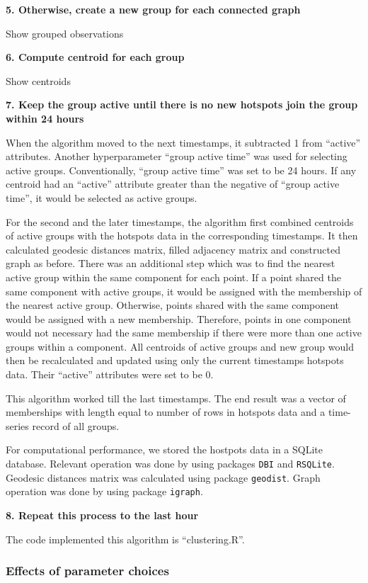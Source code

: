 \textbf{5. Otherwise, create a new group for each connected graph}

Show grouped observations

\textbf{6. Compute centroid for each group}

Show centroids

\textbf{7. Keep the group active until there is no new hotspots join the
group within 24 hours}

When the algorithm moved to the next timestamps, it subtracted 1 from
``active'' attributes. Another hyperparameter ``group active time'' was
used for selecting active groups. Conventionally, ``group active time''
was set to be 24 hours. If any centroid had an ``active'' attribute
greater than the negative of ``group active time'', it would be selected
as active groups.

For the second and the later timestamps, the algorithm first combined
centroids of active groups with the hotspots data in the corresponding
timestamps. It then calculated geodesic distances matrix, filled
adjacency matrix and constructed graph as before. There was an
additional step which was to find the nearest active group within the
same component for each point. If a point shared the same component with
active groups, it would be assigned with the membership of the nearest
active group. Otherwise, points shared with the same component would be
assigned with a new membership. Therefore, points in one component would
not necessary had the same membership if there were more than one active
groups within a component. All centroids of active groups and new group
would then be recalculated and updated using only the current timestamps
hotspots data. Their ``active'' attributes were set to be 0.

This algorithm worked till the last timestamps. The end result was a
vector of memberships with length equal to number of rows in hotspots
data and a time-series record of all groups.

For computational performance, we stored the hostpots data in a SQLite
database. Relevant operation was done by using packages \texttt{DBI} and
\texttt{RSQLite}. Geodesic distances matrix was calculated using package
\texttt{geodist}. Graph operation was done by using package
\texttt{igraph}.

\textbf{8. Repeat this process to the last hour}

The code implemented this algorithm is ``clustering.R''.

\hypertarget{effects-of-parameter-choices}{%
\subsubsection{Effects of parameter
choices}\label{effects-of-parameter-choices}}

